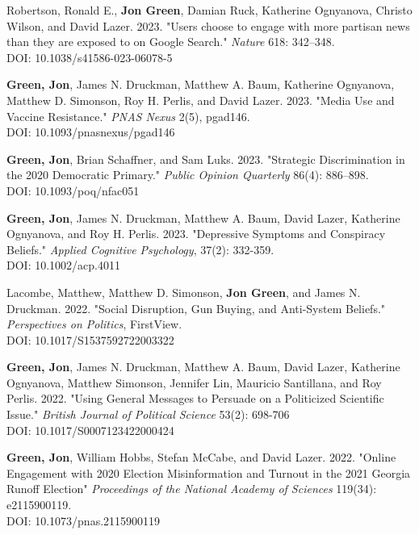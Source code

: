 \documentclass[letterpaper]{article}
\begin{document}
\begin{etaremune}
\item Robertson, Ronald E., \textbf{Jon Green}, Damian Ruck, Katherine Ognyanova, Christo Wilson, and David Lazer. 2023. "Users choose to engage with more partisan news than they are exposed to on Google Search." \textit{Nature} 618: 342–348.\\
DOI: 10.1038/s41586-023-06078-5

\item \textbf{Green, Jon}, James N. Druckman, Matthew A. Baum, Katherine Ognyanova, Matthew D. Simonson, Roy H. Perlis, and David Lazer. 2023. "Media Use and Vaccine Resistance." \textit{PNAS Nexus} 2(5), pgad146.\\
DOI: 10.1093/pnasnexus/pgad146

\item \textbf{Green, Jon}, Brian Schaffner, and Sam Luks. 2023. "Strategic Discrimination in the 2020 Democratic Primary." \textit{Public Opinion Quarterly} 86(4): 886–898.\\
DOI: 10.1093/poq/nfac051

\item \textbf{Green, Jon}, James N. Druckman, Matthew A. Baum, David Lazer, Katherine Ognyanova, and Roy H. Perlis. 2023. "Depressive Symptoms and Conspiracy Beliefs." \textit{Applied Cognitive Psychology}, 37(2): 332-359. \\
DOI: 10.1002/acp.4011

\item Lacombe, Matthew, Matthew D. Simonson, \textbf{Jon Green}, and James N. Druckman. 2022. "Social Disruption, Gun Buying, and Anti-System Beliefs." \textit{Perspectives on Politics}, FirstView. \\
DOI: 10.1017/S1537592722003322

\item  \textbf{Green, Jon}, James N. Druckman, Matthew A. Baum, David Lazer, Katherine Ognyanova, Matthew Simonson, Jennifer Lin, Mauricio Santillana, and Roy Perlis. 2022. "Using General Messages to Persuade on a Politicized Scientific Issue." \textit{British Journal of Political Science} 53(2): 698-706 \\
DOI: 10.1017/S0007123422000424

\item  \textbf{Green, Jon}, William Hobbs, Stefan McCabe, and David Lazer. 2022. "Online Engagement with 2020 Election Misinformation and Turnout in the 2021 Georgia Runoff Election"  \textit{Proceedings of the National Academy of Sciences} 119(34): e2115900119. \\
DOI: 10.1073/pnas.2115900119


\end{etaremune}
\end{document}
